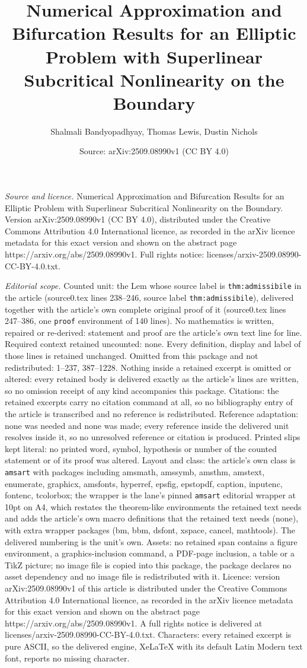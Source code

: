 \documentclass[10pt,a4paper]{amsart}
\title[Numerical Approximation and Bifurcation Results for an Ellip]{Numerical Approximation and Bifurcation Results for an Elliptic Problem with Superlinear Subcritical Nonlinearity on the Boundary}
\author{Shalmali Bandyopadhyay, Thomas Lewis, Dustin Nichols}
\date{Source: arXiv:2509.08990v1 (CC BY 4.0)}
\begin{document}
\maketitle

\noindent\emph{Source and licence.} Numerical Approximation and Bifurcation Results for an Elliptic Problem with Superlinear Subcritical Nonlinearity on the Boundary. Version arXiv:2509.08990v1 (CC BY 4.0), distributed under the Creative Commons Attribution 4.0 International licence, as recorded in the arXiv licence metadata for this exact version and shown on the abstract page https://arxiv.org/abs/2509.08990v1. Full rights notice: licenses/arxiv-2509.08990-CC-BY-4.0.txt.\par\smallskip

\noindent\textit{Editorial scope.} Counted unit: the Lem whose source label is \texttt{thm:admissibile} in the article (source0.tex lines 238--246, source label \texttt{thm:admissibile}), delivered together with the article's own complete original proof of it (source0.tex lines 247--386, one \texttt{proof} environment of 140 lines). No mathematics is written, repaired or re-derived: statement and proof are the article's own text line for line. Required context retained uncounted: none. Every definition, display and label of those lines is retained unchanged. Omitted from this package and not redistributed: 1--237, 387--1228. Nothing inside a retained excerpt is omitted or altered: every retained body is delivered exactly as the article's lines are written, so no omission receipt of any kind accompanies this package. Citations: the retained excerpts carry no citation command at all, so no bibliography entry of the article is transcribed and no reference is redistributed. Reference adaptation: none was needed and none was made; every reference inside the delivered unit resolves inside it, so no unresolved reference or citation is produced. Printed slips kept literal: no printed word, symbol, hypothesis or number of the counted statement or of its proof was altered. Layout and class: the article's own class is \texttt{amsart} with packages including amsmath, amssymb, amsthm, amstext, enumerate, graphicx, amsfonts, hyperref, epsfig, epstopdf, caption, inputenc, fontenc, tcolorbox; the wrapper is the lane's pinned \texttt{amsart} editorial wrapper at 10pt on A4, which restates the theorem-like environments the retained text needs and adds the article's own macro definitions that the retained text needs (none), with extra wrapper packages (bm, bbm, dsfont, xspace, cancel, mathtools). The delivered numbering is the unit's own. Assets: no retained span contains a figure environment, a graphics-inclusion command, a PDF-page inclusion, a table or a TikZ picture; no image file is copied into this package, the package declares no asset dependency and no image file is redistributed with it. Licence: version arXiv:2509.08990v1 of this article is distributed under the Creative Commons Attribution 4.0 International licence, as recorded in the arXiv licence metadata for this exact version and shown on the abstract page https://arxiv.org/abs/2509.08990v1. A full rights notice is delivered at licenses/arxiv-2509.08990-CC-BY-4.0.txt. Characters: every retained excerpt is pure ASCII, so the delivered engine, XeLaTeX with its default Latin Modern text font, reports no missing character.
\end{document}
